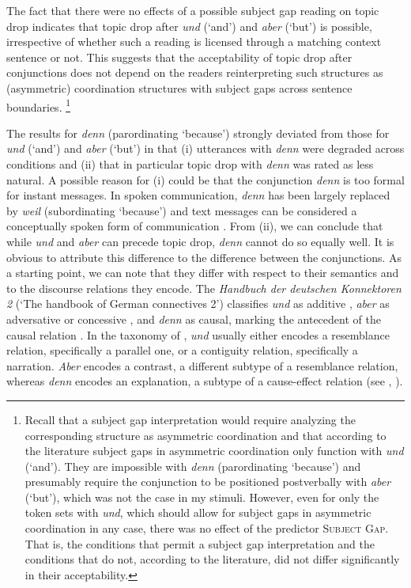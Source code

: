 The fact that there were no effects of a possible subject gap reading on topic drop indicates that topic drop after \textit{und} (`and') and \textit{aber} (`but') is possible, irrespective of whether such a reading is licensed through a matching context sentence or not.
This suggests that the acceptability of topic drop after conjunctions does not depend on the readers reinterpreting such structures as (asymmetric) coordination structures with subject gaps across sentence boundaries.%
\footnote{Recall that a subject gap interpretation would require analyzing the corresponding structure as asymmetric coordination and that according to the literature subject gaps in asymmetric coordination only function with \textit{und} (`and').
They are impossible with \textit{denn} (parordinating `because') and presumably require the conjunction to be positioned postverbally with \textit{aber} (`but'), which was not the case in my stimuli.
However, even for only the token sets with \textit{und}, which should allow for subject gaps in asymmetric coordination in any case, there was no effect of the predictor \textsc{Subject Gap}.
That is, the conditions that permit a subject gap interpretation and the conditions that do not, according to the literature, did not differ significantly in their acceptability.}
%

The results for \textit{denn} (parordinating `because') strongly deviated from those for \textit{und} (`and') and \textit{aber} (`but') in that (i) utterances with \textit{denn} were degraded across conditions and (ii) that in particular topic drop with \textit{denn} was rated as less natural.
A possible reason for (i) could be that the conjunction \textit{denn} is too formal for instant messages.
In spoken communication, \textit{denn} has been largely replaced by \textit{weil} (subordinating `because') \citep{selting1999,wegener2000} and text messages can be considered a conceptually spoken form of communication \citep{koch.oesterreicher1985}.
From (ii), we can conclude that while \textit{und} and \textit{aber} can precede topic drop, \textit{denn} cannot do so equally well.
It is obvious to attribute this difference to the difference between the conjunctions.
As a starting point, we can note that they differ with respect to their semantics and to the discourse relations they encode.
The \textit{Handbuch der deutschen Konnektoren 2} (`The handbook of German connectives 2') classifies \textit{und} as additive \citep[1211]{breindl.etal2014}, \textit{aber} as adversative or concessive \citep[1173]{breindl.etal2014}, and \textit{denn} as causal, marking the antecedent  of the causal relation \citep[1187]{breindl.etal2014}.
In the taxonomy of \citet{kehler2000,kehler2002}, \textit{und} usually either encodes a resemblance relation, specifically a parallel one, or a contiguity relation, specifically a narration.
\textit{Aber} encodes a contrast, a different subtype of a resemblance relation, whereas \textit{denn} encodes an explanation, a subtype of a cause-effect relation (see \cite[540--545]{kehler2000}, \cite[15--23]{kehler2002}).

